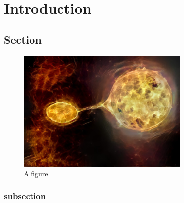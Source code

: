 \chapter{Introduction}
\label{ch:intro}

\graphicspath{{./gfx/fig_intro/}}


\section{Section}
\label{ch_intro:sec1}


\begin{figure}[tbp]
  \centering
  \includegraphics[width=0.75\textwidth]{fig}
  \caption{A figure}
  \label{fig:fig1}
\end{figure}

\subsection{subsection}


